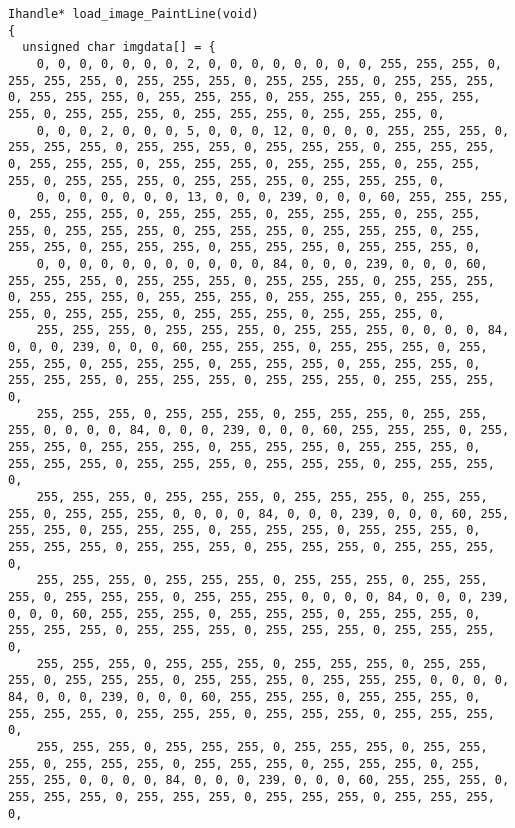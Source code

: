 \documentclass{ctexart}
\begin{document}
\begin{lstlisting}
Ihandle* load_image_PaintLine(void)
{
  unsigned char imgdata[] = {
    0, 0, 0, 0, 0, 0, 0, 2, 0, 0, 0, 0, 0, 0, 0, 0, 255, 255, 255, 0, 255, 255, 255, 0, 255, 255, 255, 0, 255, 255, 255, 0, 255, 255, 255, 0, 255, 255, 255, 0, 255, 255, 255, 0, 255, 255, 255, 0, 255, 255, 255, 0, 255, 255, 255, 0, 255, 255, 255, 0, 255, 255, 255, 0,
    0, 0, 0, 2, 0, 0, 0, 5, 0, 0, 0, 12, 0, 0, 0, 0, 255, 255, 255, 0, 255, 255, 255, 0, 255, 255, 255, 0, 255, 255, 255, 0, 255, 255, 255, 0, 255, 255, 255, 0, 255, 255, 255, 0, 255, 255, 255, 0, 255, 255, 255, 0, 255, 255, 255, 0, 255, 255, 255, 0, 255, 255, 255, 0,
    0, 0, 0, 0, 0, 0, 0, 13, 0, 0, 0, 239, 0, 0, 0, 60, 255, 255, 255, 0, 255, 255, 255, 0, 255, 255, 255, 0, 255, 255, 255, 0, 255, 255, 255, 0, 255, 255, 255, 0, 255, 255, 255, 0, 255, 255, 255, 0, 255, 255, 255, 0, 255, 255, 255, 0, 255, 255, 255, 0, 255, 255, 255, 0,
    0, 0, 0, 0, 0, 0, 0, 0, 0, 0, 0, 84, 0, 0, 0, 239, 0, 0, 0, 60, 255, 255, 255, 0, 255, 255, 255, 0, 255, 255, 255, 0, 255, 255, 255, 0, 255, 255, 255, 0, 255, 255, 255, 0, 255, 255, 255, 0, 255, 255, 255, 0, 255, 255, 255, 0, 255, 255, 255, 0, 255, 255, 255, 0,
    255, 255, 255, 0, 255, 255, 255, 0, 255, 255, 255, 0, 0, 0, 0, 84, 0, 0, 0, 239, 0, 0, 0, 60, 255, 255, 255, 0, 255, 255, 255, 0, 255, 255, 255, 0, 255, 255, 255, 0, 255, 255, 255, 0, 255, 255, 255, 0, 255, 255, 255, 0, 255, 255, 255, 0, 255, 255, 255, 0, 255, 255, 255, 0,
    255, 255, 255, 0, 255, 255, 255, 0, 255, 255, 255, 0, 255, 255, 255, 0, 0, 0, 0, 84, 0, 0, 0, 239, 0, 0, 0, 60, 255, 255, 255, 0, 255, 255, 255, 0, 255, 255, 255, 0, 255, 255, 255, 0, 255, 255, 255, 0, 255, 255, 255, 0, 255, 255, 255, 0, 255, 255, 255, 0, 255, 255, 255, 0,
    255, 255, 255, 0, 255, 255, 255, 0, 255, 255, 255, 0, 255, 255, 255, 0, 255, 255, 255, 0, 0, 0, 0, 84, 0, 0, 0, 239, 0, 0, 0, 60, 255, 255, 255, 0, 255, 255, 255, 0, 255, 255, 255, 0, 255, 255, 255, 0, 255, 255, 255, 0, 255, 255, 255, 0, 255, 255, 255, 0, 255, 255, 255, 0,
    255, 255, 255, 0, 255, 255, 255, 0, 255, 255, 255, 0, 255, 255, 255, 0, 255, 255, 255, 0, 255, 255, 255, 0, 0, 0, 0, 84, 0, 0, 0, 239, 0, 0, 0, 60, 255, 255, 255, 0, 255, 255, 255, 0, 255, 255, 255, 0, 255, 255, 255, 0, 255, 255, 255, 0, 255, 255, 255, 0, 255, 255, 255, 0,
    255, 255, 255, 0, 255, 255, 255, 0, 255, 255, 255, 0, 255, 255, 255, 0, 255, 255, 255, 0, 255, 255, 255, 0, 255, 255, 255, 0, 0, 0, 0, 84, 0, 0, 0, 239, 0, 0, 0, 60, 255, 255, 255, 0, 255, 255, 255, 0, 255, 255, 255, 0, 255, 255, 255, 0, 255, 255, 255, 0, 255, 255, 255, 0,
    255, 255, 255, 0, 255, 255, 255, 0, 255, 255, 255, 0, 255, 255, 255, 0, 255, 255, 255, 0, 255, 255, 255, 0, 255, 255, 255, 0, 255, 255, 255, 0, 0, 0, 0, 84, 0, 0, 0, 239, 0, 0, 0, 60, 255, 255, 255, 0, 255, 255, 255, 0, 255, 255, 255, 0, 255, 255, 255, 0, 255, 255, 255, 0,

\end{lstlisting}
\end{document}
